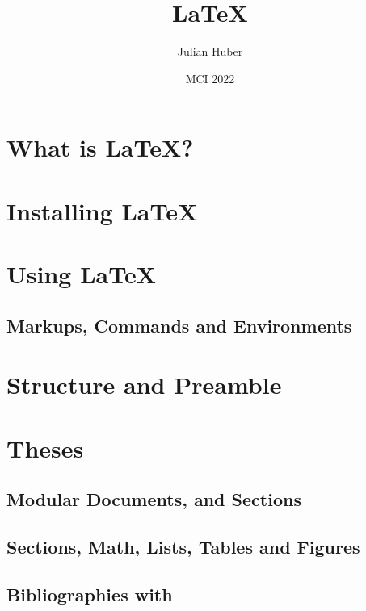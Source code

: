 \documentclass[xcolor=table,aspectratio=169]{beamer}
\author{Julian Huber}
\title{LaTeX}
\date{MCI 2022}
\begin{document}



\section{What is \LaTeX?}


\section{Installing \LaTeX}



\section{Using \LaTeX{}}
\subsection{Markups, Commands and Environments}


\section{Structure and Preamble}


\section{Theses}


\subsection{Modular Documents, and Sections}

\subsection{Sections, Math, Lists, Tables and Figures}



\subsection{Bibliographies with \texorpdfstring{\BibTeX}{BibTeX}}




\end{document}
